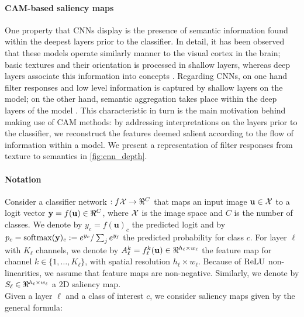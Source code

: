 \paragraph{CAM-based saliency maps}
One property that CNNs display is the presence of semantic information found within the 
deepest layers prior to the classifier. In detail, it has been observed that these models 
operate similarly manner to the visual cortex in the brain; basic textures and their orientation 
is processed in shallow layers, whereas deep layers associate this information into concepts 
\autocite{hubel1959receptive}. Regarding CNNs, on one hand filter responses and low level 
information is captured by shallow layers on the model; on the other hand, semantic aggregation 
takes place within the deep layers of the model \autocite{lee2009convolutional}. This characteristic 
in turn is the main motivation behind making use of CAM methods: by addressing interpretations on 
the layers prior to the classifier, we reconstruct the features deemed salient according to the 
flow of information within a model. We present a representation of filter responses from texture 
to semantics in \autoref{fig:cnn_depth}.

\paragraph{Notation}
\label{sec:oc_notation}
Consider a classifier network $:f \cX \to \real^C$ that maps an input image $\mathbf{u} \in \mathcal{X}$ to a 
logit vector $\vy = f(\mathbf{u}) \in \real^C$, where $\mathcal{X}$ is the image space and $C$ is the number 
of classes. We denote by $y_c = f(\mathbf{u})_c$ the predicted logit and by $p_c = \operatorname{softmax}(\mathbf{y})_c 
\mathrel{:=} e^{y_c} / \sum_j e^{y_j}$ the predicted probability for class $c$. For layer $\ell$ 
with $K_\ell$ channels, we denote by $A^k_\ell = f^k_\ell(\mathbf{u}) \in \real^{h_\ell \times w_\ell}$ 
the feature map for channel $k \in \{1,\dots,K_\ell\}$, with spatial resolution $h_\ell \times 
w_\ell$. Because of ${\operatorname{ReLU}}$ non-linearities, we assume that feature maps are non-negative. 
Similarly, we denote by $S_\ell \in \real^{h_\ell \times w_\ell}$ a 2D saliency map.\\

\label{sec:oc_back}
\noindent Given a layer $\ell$ and a class of interest $c$, we consider saliency maps given by the 
general formula: \\

